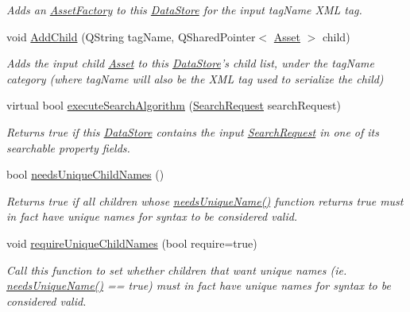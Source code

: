 \begin{DoxyCompactItemize}
\begin{DoxyCompactList}\small\item\em Adds an \hyperlink{class_picto_1_1_asset_factory}{Asset\-Factory} to this \hyperlink{class_picto_1_1_data_store}{Data\-Store} for the input tag\-Name X\-M\-L tag. \end{DoxyCompactList}\item 
void \hyperlink{class_picto_1_1_data_store_a6a6e68d0e50d9c4d3cf0dee3f30c34fa}{Add\-Child} (Q\-String tag\-Name, Q\-Shared\-Pointer$<$ \hyperlink{class_picto_1_1_asset}{Asset} $>$ child)
\begin{DoxyCompactList}\small\item\em Adds the input child \hyperlink{class_picto_1_1_asset}{Asset} to this \hyperlink{class_picto_1_1_data_store}{Data\-Store}'s child list, under the tag\-Name category (where tag\-Name will also be the X\-M\-L tag used to serialize the child) \end{DoxyCompactList}\item 
virtual bool \hyperlink{class_picto_1_1_data_store_aed17f9aa0e740aeaa8b289f0b4992990}{execute\-Search\-Algorithm} (\hyperlink{struct_search_request}{Search\-Request} search\-Request)
\begin{DoxyCompactList}\small\item\em Returns true if this \hyperlink{class_picto_1_1_data_store}{Data\-Store} contains the input \hyperlink{struct_search_request}{Search\-Request} in one of its searchable property fields. \end{DoxyCompactList}\item 
\hypertarget{class_picto_1_1_data_store_af4853c8c9ec20506d352b1c1bd01360a}{bool \hyperlink{class_picto_1_1_data_store_af4853c8c9ec20506d352b1c1bd01360a}{needs\-Unique\-Child\-Names} ()}\label{class_picto_1_1_data_store_af4853c8c9ec20506d352b1c1bd01360a}

\begin{DoxyCompactList}\small\item\em Returns true if all children whose \hyperlink{class_picto_1_1_asset_ad2b39292a4648dcdb9917f4bcf4bd658}{needs\-Unique\-Name()} function returns true must in fact have unique names for syntax to be considered valid. \end{DoxyCompactList}\item 
void \hyperlink{class_picto_1_1_data_store_aad05c80992f4af8284e6d3d1bc29515d}{require\-Unique\-Child\-Names} (bool require=true)
\begin{DoxyCompactList}\small\item\em Call this function to set whether children that want unique names (ie. \hyperlink{class_picto_1_1_asset_ad2b39292a4648dcdb9917f4bcf4bd658}{needs\-Unique\-Name()} == true) must in fact have unique names for syntax to be considered valid. \end{DoxyCompactList}\end{DoxyCompactItemize}
